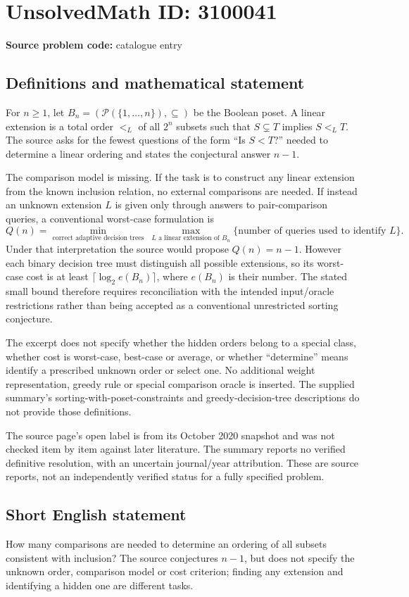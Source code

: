\documentclass[11pt]{article}
\begin{document}
\section*{UnsolvedMath ID: 3100041}
\textbf{Source problem code:} catalogue entry
\subsection{Definitions and mathematical statement}
For \(n\ge1\), let \(B_n=(\mathcal P(\{1,\ldots,n\}),\subseteq)\) be the Boolean poset. A linear extension is a total order \(<_L\) of all \(2^n\) subsets such that \(S\subsetneq T\) implies \(S<_L T\). The source asks for the fewest questions of the form ``Is \(S<T\)?'' needed to determine a linear ordering and states the conjectural answer \(n-1\).

The comparison model is missing. If the task is to construct any linear extension from the known inclusion relation, no external comparisons are needed. If instead an unknown extension \(L\) is given only through answers to pair-comparison queries, a conventional worst-case formulation is
\[
 Q(n)=\min_{\text{correct adaptive decision trees}}\ 
 \max_{L\text{ a linear extension of }B_n}
 \{\text{number of queries used to identify }L\}.
\]
Under that interpretation the source would propose \(Q(n)=n-1\). However each binary decision tree must distinguish all possible extensions, so its worst-case cost is at least \(\lceil\log_2 e(B_n)\rceil\), where \(e(B_n)\) is their number. The stated small bound therefore requires reconciliation with the intended input/oracle restrictions rather than being accepted as a conventional unrestricted sorting conjecture.

The excerpt does not specify whether the hidden orders belong to a special class, whether cost is worst-case, best-case or average, or whether ``determine'' means identify a prescribed unknown order or select one. No additional weight representation, greedy rule or special comparison oracle is inserted. The supplied summary's sorting-with-poset-constraints and greedy-decision-tree descriptions do not provide those definitions.

The source page's open label is from its October 2020 snapshot and was not checked item by item against later literature. The summary reports no verified definitive resolution, with an uncertain journal/year attribution. These are source reports, not an independently verified status for a fully specified problem.
\subsection{Short English statement}
How many comparisons are needed to determine an ordering of all subsets consistent with inclusion? The source conjectures \(n-1\), but does not specify the unknown order, comparison model or cost criterion; finding any extension and identifying a hidden one are different tasks.
\end{document}
